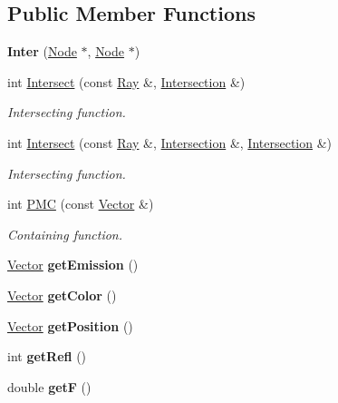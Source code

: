 \subsection*{\-Public \-Member \-Functions}
\begin{DoxyCompactItemize}
\item 
\hypertarget{class_inter_aac4a41fc06f70c3daac8e38919cc9b79}{
{\bfseries \-Inter} (\hyperlink{class_node}{\-Node} $\ast$, \hyperlink{class_node}{\-Node} $\ast$)}
\label{class_inter_aac4a41fc06f70c3daac8e38919cc9b79}

\item 
int \hyperlink{class_inter_a8b67290ace7c86e6cba66b5571466204}{\-Intersect} (const \hyperlink{class_ray}{\-Ray} \&, \hyperlink{class_intersection}{\-Intersection} \&)
\begin{DoxyCompactList}\small\item\em \-Intersecting function. \end{DoxyCompactList}\item 
int \hyperlink{class_inter_a50b2aa819ddbd2c53d26e8e7342312da}{\-Intersect} (const \hyperlink{class_ray}{\-Ray} \&, \hyperlink{class_intersection}{\-Intersection} \&, \hyperlink{class_intersection}{\-Intersection} \&)
\begin{DoxyCompactList}\small\item\em \-Intersecting function. \end{DoxyCompactList}\item 
int \hyperlink{class_inter_a62fb756b8848c042f6ea48bbe204f4a6}{\-P\-M\-C} (const \hyperlink{class_vector}{\-Vector} \&)
\begin{DoxyCompactList}\small\item\em \-Containing function. \end{DoxyCompactList}\item 
\hypertarget{class_inter_a858d782251352e10594425ccff10b162}{
\hyperlink{class_vector}{\-Vector} {\bfseries get\-Emission} ()}
\label{class_inter_a858d782251352e10594425ccff10b162}

\item 
\hypertarget{class_inter_a9fafa04883ee457fd41e4a5cb0461470}{
\hyperlink{class_vector}{\-Vector} {\bfseries get\-Color} ()}
\label{class_inter_a9fafa04883ee457fd41e4a5cb0461470}

\item 
\hypertarget{class_inter_a2a1d193dacdbae9b7393fbdf3592c434}{
\hyperlink{class_vector}{\-Vector} {\bfseries get\-Position} ()}
\label{class_inter_a2a1d193dacdbae9b7393fbdf3592c434}

\item 
\hypertarget{class_inter_a6fe2fa17f2c74536482f8b24eee5cea4}{
int {\bfseries get\-Refl} ()}
\label{class_inter_a6fe2fa17f2c74536482f8b24eee5cea4}

\item 
\hypertarget{class_inter_affe69e09e6b0f4455699a23a93688cf4}{
double {\bfseries get\-F} ()}
\label{class_inter_affe69e09e6b0f4455699a23a93688cf4}

\end{DoxyCompactItemize}


